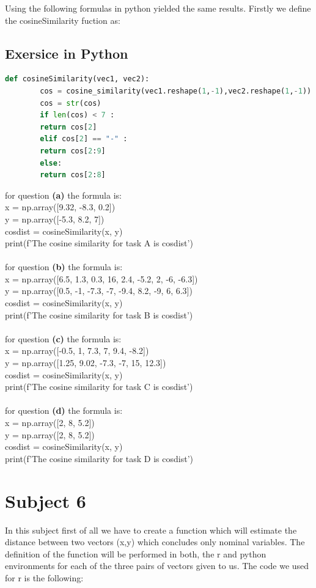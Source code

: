 \documentclass[10pt,a4paper]{article}
\begin{document}
	Using the following formulas in python yielded the same results. Firstly we define the cosineSimilarity fuction as:
	\subsection{Exersice in Python}
	\begin{lstlisting}[language=Python]
		def cosineSimilarity(vec1, vec2):
		cos = cosine_similarity(vec1.reshape(1,-1),vec2.reshape(1,-1))
		cos = str(cos)
		if len(cos) < 7 :
		return cos[2]
		elif cos[2] == "-" :
		return cos[2:9]
		else:
		return cos[2:8]
	\end{lstlisting}
	for question \textbf{(a)} the formula is:
	\\x = np.array([9.32, -8.3, 0.2])
	\\y =  np.array([-5.3, 8.2, 7])
	\\cosdist = cosineSimilarity(x, y)
	\\print(f'The cosine similarity for task A is {cosdist}')
	\\
	\\for question \textbf{(b)} the formula is:
	\\x = np.array([6.5, 1.3, 0.3, 16, 2.4, -5.2, 2, -6, -6.3])
	\\y =  np.array([0.5, -1, -7.3, -7, -9.4, 8.2, -9, 6, 6.3])
	\\cosdist = cosineSimilarity(x, y)
	\\print(f'The cosine similarity for task B is {cosdist}')
	\\
	\\for question \textbf{(c)} the formula is:
	\\x = np.array([-0.5, 1, 7.3, 7, 9.4, -8.2])
	\\y =  np.array([1.25, 9.02, -7.3, -7, 15, 12.3])
	\\cosdist = cosineSimilarity(x, y)
	\\print(f'The cosine similarity for task C is {cosdist}')
	\\
	\\for question \textbf{(d)} the formula is:
	\\x = np.array([2, 8, 5.2])
	\\y =  np.array([2, 8, 5.2])
	\\cosdist = cosineSimilarity(x, y)
	\\print(f'The cosine similarity for task D is {cosdist}')
	
	\section{Subject 6}
	In this subject first of all  we have to create a function which will estimate the distance between two vectors (x,y) which concludes only nominal variables. The definition  of the function will be performed in both, the r and python environments for each of the three pairs of vectors given to us. The code we used for r is the following:
\end{document}
